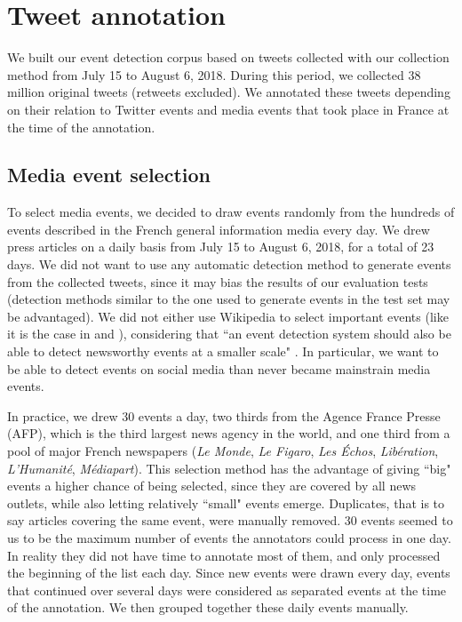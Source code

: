 \section{Tweet annotation}

We built our event detection corpus based on tweets collected with our collection method from July 15 to August 6, 2018. During this period, we collected 38 million original tweets (retweets excluded). We annotated these tweets depending on their relation to  Twitter events and media events that took place in France at the time of the annotation.
	
	\subsection{Media event selection}
	To select media events, we decided to draw events randomly
from the hundreds of events described in the French general information media every day.
    We drew press articles on a daily basis from July 15 to August 6, 2018, for a total of 23 days.
    We did not want to use any automatic detection method to generate events from the collected tweets, since it may
    bias the results of our evaluation tests (detection methods similar to the one used to generate events in the test
set may be advantaged). We did not either use Wikipedia to select important events (like it is the case in
\citet{mcminn_building_2013} and \citet{petrovic_using_2012}), considering that ``an event detection system should also
be able to detect newsworthy events at a smaller scale" \citep{hasan_survey_2018}.
In particular, we want to be able to detect events on social media than never became mainstrain media events.

In practice, we drew 30 events a day, two thirds from the Agence France Presse (AFP), which is the third largest news
agency in the world, and one third from a pool of major French  newspapers (\textit{Le Monde}, \textit{Le Figaro},
\textit{Les Échos}, \textit{Libération}, \textit{L'Humanité}, \textit{Médiapart}). This selection method has the
advantage of giving ``big" events a higher chance of being selected, since they are covered by all news outlets, while
also letting relatively ``small" events emerge. Duplicates, that is to say articles covering the same event, were
manually removed. 30 events seemed to us to be the maximum number of events the annotators could process in one day. In
reality they did not have time to annotate most of them, and only processed the beginning of the list each day.
Since new events were drawn every day, events that continued over several days were considered as separated events at
the time of the annotation. We then grouped together these daily events manually.

